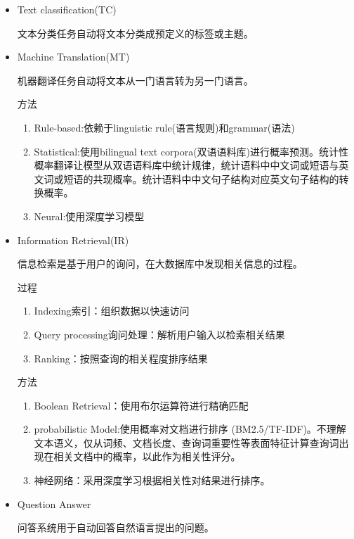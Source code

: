 \documentclass[UTF8]{ctexart}
\begin{document}
\begin{itemize}
    \item Text classification(TC)
    
    文本分类任务自动将文本分类成预定义的标签或主题。

    \item Machine Translation(MT)
    
    机器翻译任务自动将文本从一门语言转为另一门语言。

    方法
    \begin{enumerate}
        \item Rule-based:依赖于linguistic rule(语言规则)和grammar(语法)
        \item Statistical:使用bilingual text corpora(双语语料库)进行概率预测。统计性概率翻译让模型从双语语料库中统计规律，统计语料中中文词或短语与英文词或短语的共现概率。统计语料中中文句子结构对应英文句子结构的转换概率。
        \item Neural:使用深度学习模型
    \end{enumerate}

    \item Information Retrieval(IR)
    
    信息检索是基于用户的询问，在大数据库中发现相关信息的过程。

    过程
    \begin{enumerate}
        \item Indexing索引：组织数据以快速访问
        \item Query processing询问处理：解析用户输入以检索相关结果
        \item Ranking：按照查询的相关程度排序结果
    \end{enumerate}

    方法
    \begin{enumerate}
        \item Boolean Retrieval：使用布尔运算符进行精确匹配
        \item probabilistic Model:使用概率对文档进行排序 (BM2.5/TF-IDF)。不理解文本语义，仅从词频、文档长度、查询词重要性等表面特征计算查询词出现在相关文档中的概率，以此作为相关性评分。
        \item 神经网络：采用深度学习根据相关性对结果进行排序。
    \end{enumerate}



    \item Question Answer
    
    问答系统用于自动回答自然语言提出的问题。


\end{itemize}
\end{document}
